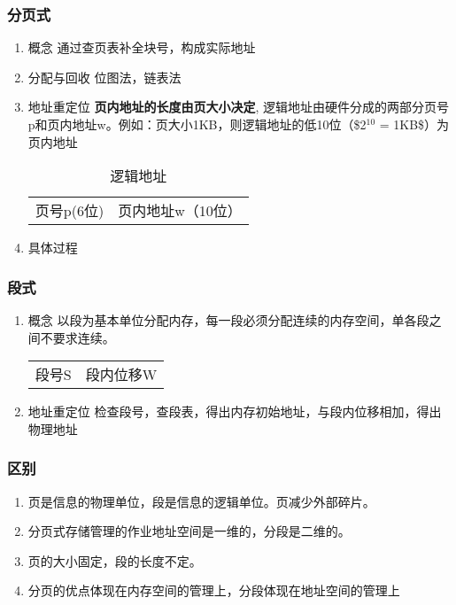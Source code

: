 \documentclass[11pt]{article}
\begin{document}
\subsubsection{分页式}
\label{sec-3-3-1}
\begin{enumerate}
\item 概念
\label{sec-3-3-1-1}
通过查页表补全块号，构成实际地址
\item 分配与回收
\label{sec-3-3-1-2}
位图法，链表法
\item 地址重定位
\label{sec-3-3-1-3}
\textbf{页内地址的长度由页大小决定}, 逻辑地址由硬件分成的两部分页号p和页内地址w。例如：页大小1KB，则逻辑地址的低10位（\$2$^{\text{10}}$ = 1KB\$）为页内地址
\begin{table}[htb]
\caption{逻辑地址}
\centering
\begin{tabular}{ll}
页号p(6位) & 页内地址w（10位）\\
\end{tabular}
\end{table}
\item 具体过程
\label{sec-3-3-1-4}
\end{enumerate}
\subsubsection{段式}
\label{sec-3-3-2}
\begin{enumerate}
\item 概念
\label{sec-3-3-2-1}
以段为基本单位分配内存，每一段必须分配连续的内存空间，单各段之间不要求连续。
\begin{center}
\begin{tabular}{ll}
段号S & 段内位移W\\
\end{tabular}
\end{center}
\item 地址重定位
\label{sec-3-3-2-2}
检查段号，查段表，得出内存初始地址，与段内位移相加，得出物理地址
\end{enumerate}
\subsubsection{区别}
\label{sec-3-3-3}
\begin{enumerate}
\item 页是信息的物理单位，段是信息的逻辑单位。页减少外部碎片。
\item 分页式存储管理的作业地址空间是一维的，分段是二维的。
\item 页的大小固定，段的长度不定。
\item 分页的优点体现在内存空间的管理上，分段体现在地址空间的管理上
\end{enumerate}
\end{document}
